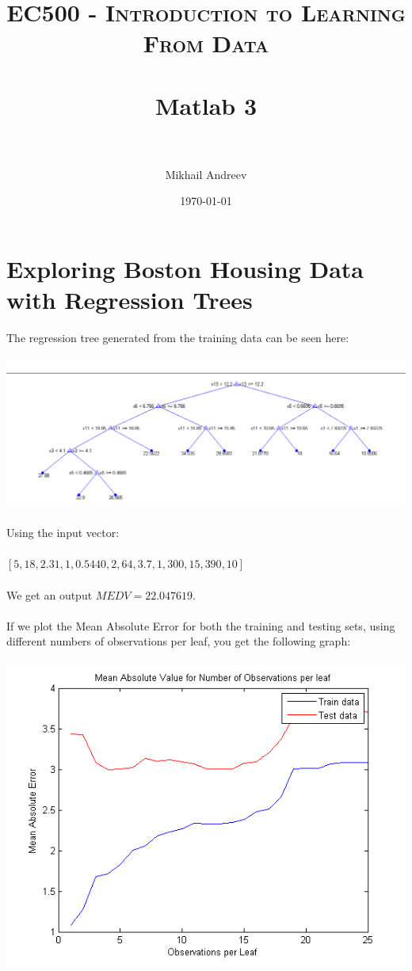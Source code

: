 \documentclass[paper=a4, fontsize=11pt]{scrartcl} %
\title{	
	\normalfont \normalsize 
	\textsc{EC500 - Introduction to Learning From Data} \\ [25pt] %
	\horrule{0.5pt} \\[0.4cm] %
	\huge Matlab 3 \\ %
	\horrule{2pt} \\[0.5cm] %
}
\author{Mikhail Andreev} %
\date{\normalsize\today} %
\numberwithin{equation}{section} %
\numberwithin{figure}{section} %
\numberwithin{table}{section} %
\begin{document}
	
	\maketitle %
	

	
	\newpage
	\section{Exploring Boston Housing Data with Regression Trees}
	The regression tree generated from the training data can be seen here:
	\\\\
	\hspace*{-3cm}\includegraphics[scale=.7]{tree_diagram}
	\\\\
	Using the input vector:
	\\\\
	$[5, 18, 2.31, 1, 0.5440, 2, 64, 3.7, 1, 300, 15, 390, 10]$
	\\\\
	We get an output $MEDV = 22.047619$.
	\\\\
	If we plot the Mean Absolute Error for both the training and testing sets, using different numbers of observations per leaf, you get the following graph:
	\\\\
	\includegraphics{mae_for_different_observations} 
\end{document}
